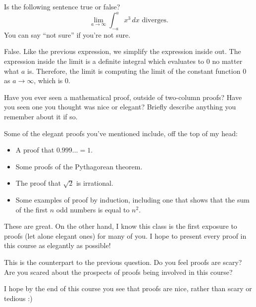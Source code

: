 \begin{question}
  Is the following sentence true or false?
  \[\lim_{a\to\infty}\int_{-a}^a x^3\,dx\text{ diverges}.\]
  You can say ``not sure'' if you're not sure.
\end{question}
\begin{solution}
  False. Like the previous expression, we simplify the expression inside out. The expression inside the limit is a definite integral which evaluates to 0 no matter what $a$ is. Therefore, the limit is computing the limit of the constant function 0 as $a\to\infty$, which is 0.
\end{solution}

\begin{question}
  Have you ever seen a mathematical proof, outside of two-column proofs? Have you seen one you thought was nice or elegant? Briefly describe anything you remember about it if so.
\end{question}
\begin{solution}
  Some of the elegant proofs you've mentioned include, off the top of my head:
  \begin{itemize}
    \item A proof that $0.999\ldots=1$.
    \item Some proofs of the Pythagorean theorem.
    \item The proof that $\sqrt2$ is irrational.
    \item Some examples of proof by induction, including one that shows that the sum of the first $n$ odd numbers is equal to $n^2$.
  \end{itemize}
  These are great. On the other hand, I know this class is the first exposure to proofs (let alone elegant ones) for many of you. I hope to present every proof in this course as elegantly as possible!
\end{solution}

\begin{question}
  This is the counterpart to the previous question. Do you feel proofs are scary? Are you scared about the prospects of proofs being involved in this course?
\end{question}
\begin{solution}
  I hope by the end of this course you see that proofs are nice, rather than scary or tedious :)
\end{solution}
